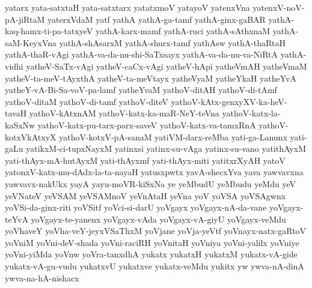 {yatarx
yata-satxtaH
yata-satxtarx
yatatxmoV
yatayoV
yatenxVna
yatenxV-noV-pA-jiRtaM
yaterxVdaM
yatf
yathA
yathA-ga-tamf
yathA-ginx-gaBAR
yathA-kaq-hamx-ti-pa-tatxyeV
yathA-karx-mamf
yathA-ruci
yathA-sAthxnaM
yathA-saM-KeyxVna
yathA-shAsarxM
yathA-shurx-tamf
yathAsw
yathA-thaRtaH
yathA-thaR-vAgi
yathA-va-da-nu-shi-SaTxsayx
yathA-va-da-nu-va-NiRtA
yathA-vidhi
yatheV-SaTx-vAgi
yatheV-caCx-vAgi
yatheV-hApi
yatheVmAH
yatheVmaM
yatheV-ta-meV-tAyxthA
yatheV-ta-meVtayx
yatheVyaM
yatheYkaH
yatheYvA
yatheY-vA-Bi-Sa-voV-pa-lamf
yatheYvaM
yathoV-ditAH
yathoV-di-tAmf
yathoV-ditaM
yathoV-di-tamf
yathoV-diteV
yathoV-kAtx-genxyXV-ka-heV-tavaH
yathoV-kAtxnAM
yathoV-katx-ka-maR-NeY-teVna
yathoV-katx-la-kaSxNw
yathoV-katx-pu-tarx-parx-saveV
yathoV-katx-va-tamxRnA
yathoV-kotxVkAtxyX
yathoV-kotxV-pA-sanaM
yatiVM-darx-reMba
yati-ga-Lanunx
yati-gaLu
yatikxM-ci-tupxNayxM
yatinxsi
yatinx-su-vAga
yatinx-su-vano
yatithAyxM
yati-thAyx-mA-hutAyxM
yati-thAyxmf
yati-thAyx-miti
yatitxrXyAH
yatoV
yatonxV-katx-mu-dAdx-la-ta-nayaH
yatusxpwtx
yavA-shecxYva
yava
yawvavxna
yawvavx-nakUkx
yayA
yayu-moVR-kiSxNa
ye
yeMbudU
yeMbudu
yeMdu
yeV
yeVNateV
yeVSAM
yeVSAMnoV
yeVnAtaH
yeVna
yoV
yoVSA
yoVSAgwnx
yoVSi-da-ginx-riti
yoVSitf
yoVci-si-darU
yoVgayx
yoVgayx-nA-da-vane
yoVgayx-teYvA
yoVgayx-te-yanenx
yoVgayx-vAda
yoVgayx-vA-giyU
yoVgayx-veMdu
yoVhaveY
yoVha-veY-jeyxVSaThxM
yoVjane
yoVja-yeVtf
yoVnayx-natx-gaRtoV
yoVniM
yoVni-deV-shada
yoVni-raciRH
yoVnitaH
yoVniya
yoVni-yalilx
yoVniye
yoVni-yiMda
yoVnw
yoVra-tanxdhA
yukatx
yukatxH
yukatxM
yukatx-vA-gide
yukatx-vA-gu-vudu
yukatxvU
yukatxve
yukatx-veMdu
yukitx
yw
ywva-nA-dinA
ywva-na-hA-nishacx
}
